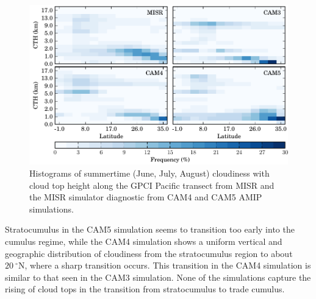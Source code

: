\begin{figure}
    \centering
    \includegraphics{../graphics/cldcth_camamip_gpci.pdf}
    \caption[Histograms of summertime cloudiness with cloud top height along the GPCI Pacific transect from MISR and the MISR simulator diagnostic from CAM4 and CAM5 AMIP simulations.]{Histograms of summertime (June, July, August) cloudiness with cloud top height along the GPCI Pacific transect from MISR and the MISR simulator diagnostic from CAM4 and CAM5 AMIP simulations.}
    \label{cldcth_camamip_gpci}
\end{figure}

Stratocumulus in the CAM5 simulation seems to transition too early into the cumulus regime, while the CAM4 simulation shows a uniform vertical and geographic distribution of cloudiness from the stratocumulus region to about $20~^\circ\text{N}$, where a sharp transition occurs. This transition in the CAM4 simulation is similar to that seen in the CAM3 simulation. None of the simulations capture the rising of cloud tops in the transition from stratocumulus to trade cumulus.

